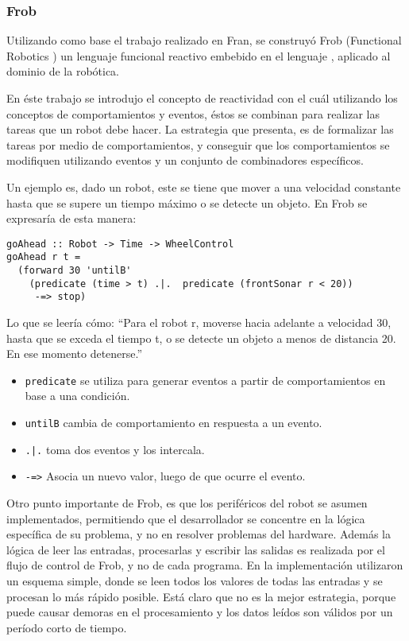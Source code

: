 \subsubsection{Frob}

  Utilizando como base el trabajo realizado en Fran, se construyó Frob
(Functional Robotics \cite{petersonhudakelliot99:lambdainmotion}
\cite{petersonhagerhudak99:frob})
un lenguaje funcional reactivo embebido en el lenguaje \haskell{},
aplicado al dominio de la robótica.
  
  En éste trabajo se introdujo el concepto de reactividad con el cuál
utilizando los conceptos de comportamientos y eventos, éstos se combinan
para realizar las tareas que un robot debe hacer.
  La estrategia que presenta, es de formalizar las tareas por medio de
comportamientos, y conseguir que los comportamientos se modifiquen
utilizando eventos y un conjunto de combinadores específicos.

  Un ejemplo es, dado un robot, este se tiene que mover a una velocidad
constante hasta que se supere un tiempo máximo o se detecte un objeto.
  En Frob se expresaría de esta manera:

\begin{verbatim}
goAhead :: Robot -> Time -> WheelControl
goAhead r t =
  (forward 30 'untilB'
    (predicate (time > t) .|.  predicate (frontSonar r < 20))
     -=> stop)
\end{verbatim}

  Lo que se leería cómo: ``Para el robot r, moverse hacia adelante a
velocidad 30, hasta que se exceda el tiempo t, o se detecte un objeto
a menos de distancia 20. En ese momento detenerse.''

\begin{itemize}
  \item \texttt{predicate} se utiliza para generar eventos a partir
        de comportamientos en base a una condición.
  \item \texttt{untilB} cambia de comportamiento en respuesta
        a un evento.
  \item \texttt{.|.} toma dos eventos y los intercala.
  \item \texttt{-=>} Asocia un nuevo valor, luego de que ocurre el evento.
\end{itemize}

  Otro punto importante de Frob, es que los periféricos del robot se
asumen implementados, permitiendo que el desarrollador se concentre
en la lógica específica de su problema, y no en resolver problemas
del hardware.
  Además la lógica de leer las entradas, procesarlas y escribir las salidas
es realizada por el flujo de control de Frob, y no de cada programa.
  En la implementación utilizaron un esquema simple, donde se leen todos
los valores de todas las entradas y se procesan lo más rápido posible.
  Está claro que no es la mejor estrategia, porque puede causar demoras
en el procesamiento y los datos leídos son válidos por un
período corto de tiempo.


